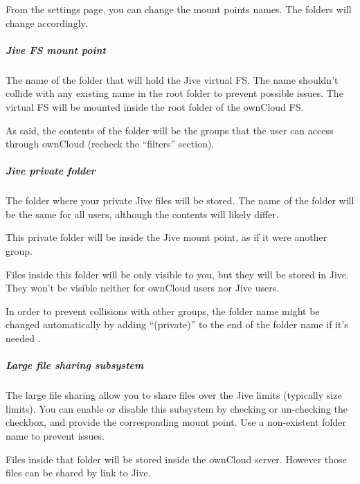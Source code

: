 \documentclass[letterpaper,10pt,english]{sphinxmanual}
\begin{document}
From the settings page, you can change the mount points names. The folders will change accordingly.


\subparagraph{Jive FS mount point}
\label{enterprise_external_storage/jive_configuration:jive-fs-mount-point}
The name of the folder that will hold the Jive virtual FS. The name shouldn't collide with any existing name in the root folder to prevent possible issues.
The virtual FS will be mounted inside the root folder of the ownCloud FS.

As said, the contents of the folder will be the groups that the user can access through ownCloud (recheck the “filters” section).


\subparagraph{Jive private folder}
\label{enterprise_external_storage/jive_configuration:jive-private-folder}
The folder where your private Jive files will be stored. The name of the folder will be the same for all users, although the contents will likely differ.

This private folder will be inside
the Jive mount point, as if it were another group.

Files inside this folder will be only visible to you, but they will be stored in Jive. They won't be visible neither for ownCloud users nor Jive users.

In order to prevent collisions with other groups, the folder name might be changed automatically by adding “(private)” to the end of the folder name
if it's needed
.


\subparagraph{Large file sharing subsystem}
\label{enterprise_external_storage/jive_configuration:large-file-sharing-subsystem}
The large file sharing allow you to share files over the Jive limits (typically size limits). You can enable
or disable this subsystem by checking or un-checking the checkbox, and provide the corresponding mount point.
Use a non-existent folder name to prevent issues.

Files inside that folder will be stored inside the ownCloud server. However those files can be shared by link to Jive.
\end{document}
